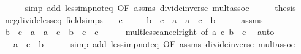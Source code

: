 \begin{isabellebody}
\ \ \ \ \isamarkupfalse%
\ {\isacharparenleft}{\kern0pt}simp\ add{\isacharcolon}{\kern0pt}\ less{\isacharunderscore}{\kern0pt}imp{\isacharunderscore}{\kern0pt}not{\isacharunderscore}{\kern0pt}eq\ {\isacharbrackleft}{\kern0pt}OF\ assms{\isacharbrackright}{\kern0pt}\ divide{\isacharunderscore}{\kern0pt}inverse\ mult{\isachardot}{\kern0pt}assoc{\isacharparenright}{\kern0pt}\isanewline
\ \ \isamarkupfalse%
\ \isamarkupfalse%
\ {\isacharquery}{\kern0pt}thesis\ \isacommand{{\isachardot}{\kern0pt}}\isamarkupfalse%
\isanewline
{}\isamarkupfalse%
%
\endisatagproof
{\isafoldproof}%
%
\isadelimproof
\isanewline
%
\endisadelimproof
\isanewline
{}\isamarkupfalse%
\ neg{\isacharunderscore}{\kern0pt}divide{\isacharunderscore}{\kern0pt}less{\isacharunderscore}{\kern0pt}eq\ {\isacharbrackleft}{\kern0pt}field{\isacharunderscore}{\kern0pt}simps{\isacharbrackright}{\kern0pt}{\isacharcolon}{\kern0pt}\isanewline
\ \ \ {\isachardoublequoteopen}c\ {\isacharless}{\kern0pt}\ {}{\isachardoublequoteclose}\isanewline
\ \ \ {\isachardoublequoteopen}b\ {\isacharslash}{\kern0pt}\ c\ {\isacharless}{\kern0pt}\ a\ {\isasymlongleftrightarrow}\ a\ {\isacharasterisk}{\kern0pt}\ c\ {\isacharless}{\kern0pt}\ b{\isachardoublequoteclose}\isanewline
%
\isadelimproof
%
\endisadelimproof
%
\isatagproof
{}\isamarkupfalse%
\ {\isacharminus}{\kern0pt}\isanewline
\ \ \isamarkupfalse%
\ assms\ \isamarkupfalse%
\ {\isachardoublequoteopen}b\ {\isacharslash}{\kern0pt}\ c\ {\isacharless}{\kern0pt}\ a\ {\isasymlongleftrightarrow}\ a\ {\isacharasterisk}{\kern0pt}\ c\ {\isacharless}{\kern0pt}\ b\ {\isacharslash}{\kern0pt}\ c\ {\isacharasterisk}{\kern0pt}\ c{\isachardoublequoteclose}\isanewline
\ \ \ \ \isamarkupfalse%
\ mult{\isacharunderscore}{\kern0pt}less{\isacharunderscore}{\kern0pt}cancel{\isacharunderscore}{\kern0pt}right\ {\isacharbrackleft}{\kern0pt}of\ a\ c\ {\isachardoublequoteopen}b\ {\isacharslash}{\kern0pt}\ c{\isachardoublequoteclose}{\isacharbrackright}{\kern0pt}\ \isamarkupfalse%
\ auto\isanewline
\ \ \isamarkupfalse%
\ \isamarkupfalse%
\ {\isachardoublequoteopen}{\isachardot}{\kern0pt}{\isachardot}{\kern0pt}{\isachardot}{\kern0pt}\ {\isasymlongleftrightarrow}\ a\ {\isacharasterisk}{\kern0pt}\ c\ {\isacharless}{\kern0pt}\ b{\isachardoublequoteclose}\isanewline
\ \ \ \ \isamarkupfalse%
\ {\isacharparenleft}{\kern0pt}simp\ add{\isacharcolon}{\kern0pt}\ less{\isacharunderscore}{\kern0pt}imp{\isacharunderscore}{\kern0pt}not{\isacharunderscore}{\kern0pt}eq\ {\isacharbrackleft}{\kern0pt}OF\ assms{\isacharbrackright}{\kern0pt}\ divide{\isacharunderscore}{\kern0pt}inverse\ mult{\isachardot}{\kern0pt}assoc{\isacharparenright}{\kern0pt}\isanewline

\end{isabellebody}
